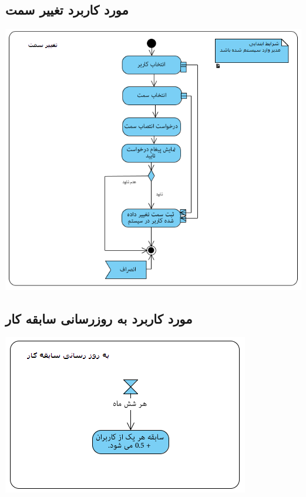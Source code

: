\newpage
\vspace{2cm}
\subsection*{مورد کاربرد تغییر سمت}
\vspace{2cm}
\begin{center}
\includegraphics[width=\textwidth]{ActivityDiagrams/8.png}
\end{center}

\newpage
\vspace{2cm}
\subsection*{مورد کاربرد به روزرسانی سابقه کار}
\vspace{2cm}
\begin{center}
\includegraphics[width=\textwidth]{ActivityDiagrams/9.png}
\end{center}

